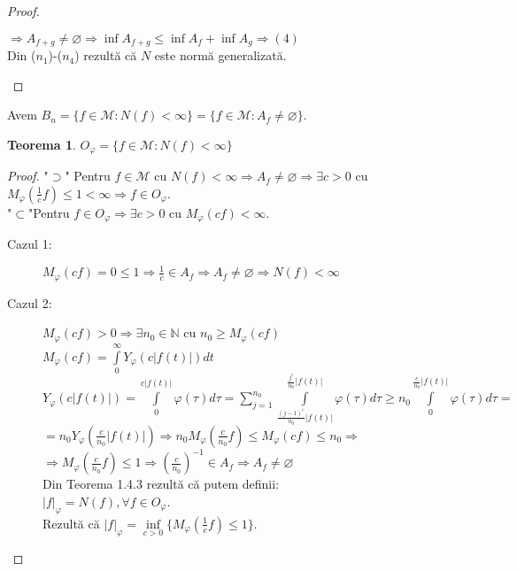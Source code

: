 \documentclass[ a4paper, 12pt]{report}
\newtheorem{theorem}{\bf Teorema}[section]
\theoremstyle{definition}
\theoremstyle{remark}
\numberwithin{equation}{section}
\begin{document}
\begin{proof}
\begin{enumerate}[($n_1$)]
$\Rightarrow A_{f+g} \neq \varnothing \Rightarrow \inf A_{f+g} \leq \inf A_f + \inf A_g \Rightarrow (4)$\\
Din ($n_1$)-($n_4$) rezult\u a c\u a $ N$ este norm\u a generalizat\u a.\\
\end{enumerate}
\end{proof}
\newpage
Avem $B_n = \{f \in \mathcal{M}: N(f) < \infty\} = \{f \in \mathcal{M}: A_f \neq \varnothing\}.$\\
\begin{theorem}
$O_\varphi =\{ f \in \mathcal{M}: N(f) < \infty\}$
\end{theorem}
\begin{proof}
"$\supset$" Pentru $f \in \mathcal{M}$ cu $N(f) < \infty \Rightarrow A_f \neq \varnothing \Rightarrow \exists c>0$ cu $M_\varphi \left (\frac{1}{c}f \right ) \leq 1 < \infty \Rightarrow f \in O_\varphi$.\\
"$\subset$"Pentru $f \in O_\varphi \Rightarrow \exists c >0$ cu $M_\varphi (cf) < \infty$.\\
\begin{description}

\item[Cazul 1:]$M_\varphi (cf) = 0 \leq 1 \Rightarrow \frac{1}{c} \in A_f \Rightarrow A_f \neq \varnothing \Rightarrow N(f)<\infty$

\item[Cazul 2:] $M_\varphi (cf) > 0 \Rightarrow \exists n_0 \in \mathbb{N}$ cu $n_0\geq M_\varphi (cf)$\\
$M_\varphi (cf) = \int\limits_{0}^{\infty} Y_\varphi (c \lvert f(t) \rvert) dt$\\
$Y_\varphi (c \lvert f(t) \rvert) = \int\limits_{0}^{c\lvert f(t) \rvert} \varphi(\tau) d\tau = \sum\limits_{j=1}^{n_0} \int\limits_{\frac{(j-1)^c}{n_0} \lvert f(t) \rvert}^{\frac{j^c}{n_0}\lvert f(t) \rvert} \varphi (\tau) d\tau \geq n_0 \int\limits_{0}^{\frac{c}{n_0} \lvert f(t) \rvert}  \varphi(\tau) d\tau =$\\ $= n_0 Y_\varphi\left (\frac{c}{n_0}\lvert f(t) \rvert \right) \Rightarrow n_0 M_\varphi \left (\frac{c}{n_0}f \right ) \leq M_\varphi (cf) \leq n_0 \Rightarrow $\\ $\Rightarrow M_\varphi \left (\frac{c}{n_0}f \right ) \leq 1 \Rightarrow (\frac{c}{n_0})^{-1} \in A_f \Rightarrow A_f \neq \varnothing $ \\
Din Teorema 1.4.3 rezult\u a c\u a putem  definii:\\
$\lvert f \rvert _\varphi = N(f) , \forall f \in O_\varphi$.\\
Rezult\u a c\u a $\lvert f \rvert _\varphi = \inf\limits_{c>0} \Big \{M_\varphi \left (\frac{1}{c}f \right )\leq 1 \Big \}$.
\end{description}
\end{proof}
\end{document}
